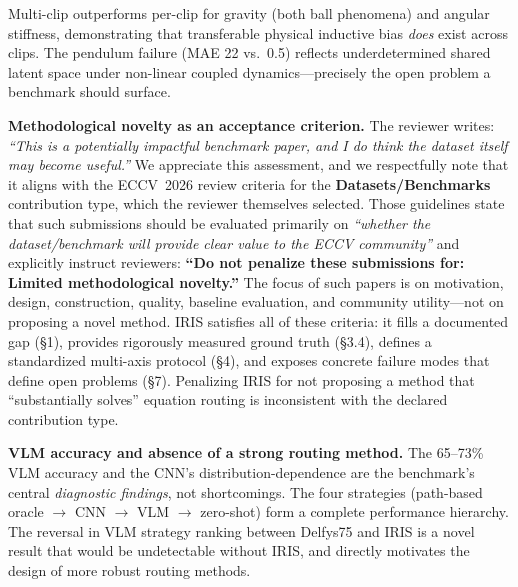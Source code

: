 \documentclass[10pt,twocolumn,letterpaper]{article}
\begin{document}
\noindent Multi-clip outperforms per-clip for gravity (both ball phenomena) and angular stiffness, demonstrating that transferable physical inductive bias \emph{does} exist across clips. The pendulum failure (MAE 22 vs.\ 0.5) reflects underdetermined shared latent space under non-linear coupled dynamics---precisely the open problem a benchmark should surface.

\noindent\textbf{Methodological novelty as an acceptance criterion.}
The reviewer writes: \emph{``This is a potentially impactful benchmark paper, and I do think the dataset itself may become useful.''} We appreciate this assessment, and we respectfully note that it aligns with the ECCV~2026 review criteria for the \textbf{Datasets/Benchmarks} contribution type, which the reviewer themselves selected. Those guidelines state that such submissions should be evaluated primarily on \emph{``whether the dataset/benchmark will provide clear value to the ECCV community''} and explicitly instruct reviewers: \textbf{``Do not penalize these submissions for: Limited methodological novelty.''} The focus of such papers is on motivation, design, construction, quality, baseline evaluation, and community utility---not on proposing a novel method. IRIS satisfies all of these criteria: it fills a documented gap (\S1), provides rigorously measured ground truth (\S3.4), defines a standardized multi-axis protocol (\S4), and exposes concrete failure modes that define open problems (\S7). Penalizing IRIS for not proposing a method that ``substantially solves'' equation routing is inconsistent with the declared contribution type.

\noindent\textbf{VLM accuracy and absence of a strong routing method.}
The 65--73\% VLM accuracy and the CNN's distribution-dependence are the benchmark's central \emph{diagnostic findings}, not shortcomings. The four strategies (path-based oracle $\to$ CNN $\to$ VLM $\to$ zero-shot) form a complete performance hierarchy. The reversal in VLM strategy ranking between Delfys75 and IRIS is a novel result that would be undetectable without IRIS, and directly motivates the design of more robust routing methods.
\end{document}
